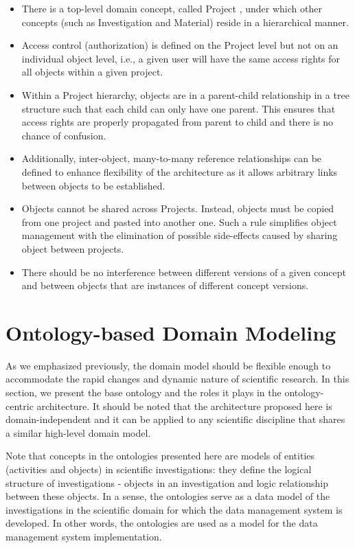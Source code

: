 \documentclass{llncs}
\begin{document}
\begin{itemize}
\item There is a top-level domain concept, called Project , under which
other concepts (such as Investigation and Material) reside in a
hierarchical manner.

\item Access control (authorization) is defined on the Project level but
not on an individual object level, i.e., a given user will have the
same access rights for all objects within a given project.

\item Within a Project hierarchy, objects are in a parent-child
relationship in a tree structure such that each child can only have one
parent. This ensures that access rights are properly propagated from
parent to child and there is no chance of confusion.

\item Additionally, inter-object, many-to-many reference relationships
can be defined to enhance flexibility of the architecture as it allows
arbitrary links between objects to be established.

\item Objects cannot be shared across Projects. Instead, objects must be
copied from one project and pasted into another one. Such a rule
simplifies object management with the elimination of possible
side-effects caused by sharing object between projects.

\item There should be no interference between different versions of a
given concept and between objects that are instances of different
concept versions.
\end{itemize}

\section{Ontology-based Domain Modeling}\label{sec:ont}
As we emphasized previously, the domain model should be flexible enough
to accommodate the rapid changes and dynamic nature of scientific
research. In this section, we present the base ontology and the roles
it plays in the ontology-centric architecture. It should be noted that
the architecture proposed here is domain-independent and it can be
applied to any scientific discipline that shares a similar high-level
domain model.

Note that concepts in the ontologies presented here are models of entities
(activities and objects) in scientific investigations: they define the logical
structure of investigations - objects in an investigation and logic relationship 
between these objects. 
In a sense, the ontologies serve as a data model of the investigations in 
the scientific domain for which the data management system is developed.
In other words, the ontologies are used as a model for the data management 
system implementation.
\end{document}
